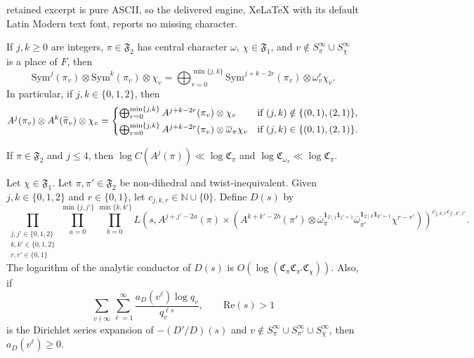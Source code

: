 \documentclass[10pt,a4paper]{amsart}
\newcommand{\re}{\mathrm{Re}}
\renewcommand{\bar}{\overline}
\begin{document}
retained excerpt is pure ASCII, so the delivered engine, XeLaTeX with its default Latin Modern text font, reports no missing character.
\begin{lemma}
\label{lem:CG}
If $j,k\geq 0$ are integers, $\pi\in\mathfrak{F}_{2}$ has central character $\omega$, $\chi\in\mathfrak{F}_1$, and $v\notin S_{\pi}^{\infty}\cup S_{\chi}^{\infty}$ is a place of $F$, then
\[
\mathrm{Sym}^{j}(\pi_v)\otimes\mathrm{Sym}^k(\pi_v)\otimes\chi_v=\bigoplus_{r=0}^{\min\{j,k\}}\mathrm{Sym}^{j+k-2r}(\pi_v)\otimes\omega_{v}^{r}\chi_v.
\]
In particular, if $j,k\in\{0,1,2\}$, then
\[
A^j(\pi_v)\otimes A^k(\widetilde{\pi}_v)\otimes\chi_v = \begin{cases}
\bigoplus_{r=0}^{\min\{j,k\}} A^{j+k-2r}(\pi_v)\otimes\chi_v&\mbox{if $(j,k)\notin\{(0,1),(2,1)\}$,}\vspace{1mm}\\
\bigoplus_{r=0}^{\min\{j,k\}} A^{j+k-2r}(\pi_v)\otimes \bar{\omega}_{\pi}\chi_v&\mbox{if $(j,k)\in\{(0,1),(2,1)\}$.}
\end{cases}
\]
\end{lemma}

\begin{lemma}
\label{lem:AC}
If $\pi\in\mathfrak{F}_2$ and $j\leq 4$, then $\log C(A^j(\pi))\ll \log \mathfrak{C}_{\pi}$ and $\log \mathfrak{C}_{\omega_{\pi}}\ll \log \mathfrak{C}_{\pi}$.
\end{lemma}

\begin{lemma}
\label{lem:D}
Let $\chi\in\mathfrak{F}_1$.  Let $\pi,\pi'\in\mathfrak{F}_2$ be non-dihedral and twist-inequivalent.  Given $j,k\in\{0,1,2\}$ and $r\in\{0,1\}$, let $c_{j,k,r}\in\mathbb{N}\cup\{0\}$.  Define $D(s)$ by
\[
\prod_{\substack{j,j'\in\{0,1,2\} \\ k,k'\in\{0,1,2\} \\ r,r'\in\{0,1\}}}\prod_{a=0}^{\min\{j,j'\}}\prod_{b=0}^{\min\{k,k'\}}L(s, A^{j+j'-2a}(\pi)\times (A^{k+k'-2b}(\pi')\otimes \bar{\omega}_{\pi}^{\mathbf{1}_{2\mid j}\mathbf{1}_{j'=1}}\bar{\omega}_{\pi'}^{\mathbf{1}_{2\mid k}\mathbf{1}_{k'=1}}\chi^{r-r'}))^{c_{j,k,r}c_{j',k',r'}}.
\]
The logarithm of the analytic conductor of $D(s)$ is $O(\log(\mathfrak{C}_{\pi}\mathfrak{C}_{\pi'}\mathfrak{C}_{\chi}))$.  Also, if
\[
\sum_{v\nmid\infty}\sum_{\ell=1}^{\infty}\frac{a_D(v^{\ell})\log q_v}{q_v^{\ell s}},\qquad \re(s)>1
\]
is the Dirichlet series expansion of $-(D'/D)(s)$ and $v\notin S_{\pi}^{\infty}\cup S_{\pi'}^{\infty}\cup S_{\chi}^{\infty}$, then $a_D(v^{\ell})\geq 0$.
\end{lemma}
\end{document}
